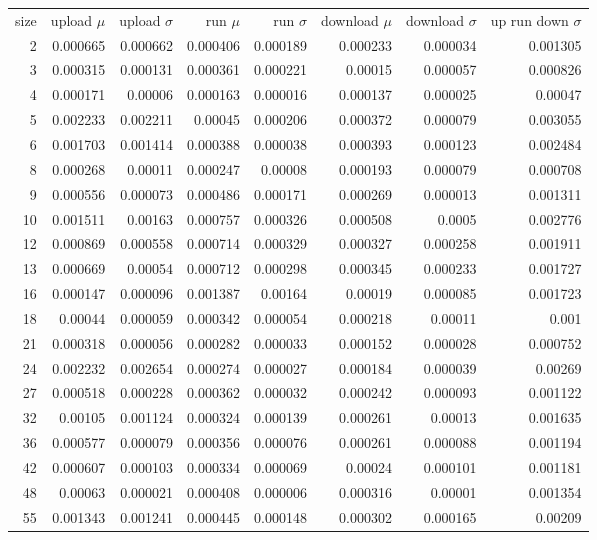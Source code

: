 \begin{longtable}{r r r r r r r r}
size & upload $\mu$  & upload $\sigma$ & run $\mu$ & run $\sigma$ & download $\mu$ & download $\sigma$ & up run down $\sigma$ \\
2 & 0.000665 & 0.000662 & 0.000406 & 0.000189 & 0.000233 & 0.000034 & 0.001305 \\
3 & 0.000315 & 0.000131 & 0.000361 & 0.000221 & 0.00015 & 0.000057 & 0.000826 \\
4 & 0.000171 & 0.00006 & 0.000163 & 0.000016 & 0.000137 & 0.000025 & 0.00047 \\
5 & 0.002233 & 0.002211 & 0.00045 & 0.000206 & 0.000372 & 0.000079 & 0.003055 \\
6 & 0.001703 & 0.001414 & 0.000388 & 0.000038 & 0.000393 & 0.000123 & 0.002484 \\
8 & 0.000268 & 0.00011 & 0.000247 & 0.00008 & 0.000193 & 0.000079 & 0.000708 \\
9 & 0.000556 & 0.000073 & 0.000486 & 0.000171 & 0.000269 & 0.000013 & 0.001311 \\
10 & 0.001511 & 0.00163 & 0.000757 & 0.000326 & 0.000508 & 0.0005 & 0.002776 \\
12 & 0.000869 & 0.000558 & 0.000714 & 0.000329 & 0.000327 & 0.000258 & 0.001911 \\
13 & 0.000669 & 0.00054 & 0.000712 & 0.000298 & 0.000345 & 0.000233 & 0.001727 \\
16 & 0.000147 & 0.000096 & 0.001387 & 0.00164 & 0.00019 & 0.000085 & 0.001723 \\
18 & 0.00044 & 0.000059 & 0.000342 & 0.000054 & 0.000218 & 0.00011 & 0.001 \\
21 & 0.000318 & 0.000056 & 0.000282 & 0.000033 & 0.000152 & 0.000028 & 0.000752 \\
24 & 0.002232 & 0.002654 & 0.000274 & 0.000027 & 0.000184 & 0.000039 & 0.00269 \\
27 & 0.000518 & 0.000228 & 0.000362 & 0.000032 & 0.000242 & 0.000093 & 0.001122 \\
32 & 0.00105 & 0.001124 & 0.000324 & 0.000139 & 0.000261 & 0.00013 & 0.001635 \\
36 & 0.000577 & 0.000079 & 0.000356 & 0.000076 & 0.000261 & 0.000088 & 0.001194 \\
42 & 0.000607 & 0.000103 & 0.000334 & 0.000069 & 0.00024 & 0.000101 & 0.001181 \\
48 & 0.00063 & 0.000021 & 0.000408 & 0.000006 & 0.000316 & 0.00001 & 0.001354 \\
55 & 0.001343 & 0.001241 & 0.000445 & 0.000148 & 0.000302 & 0.000165 & 0.00209 \\

\end{longtable}
